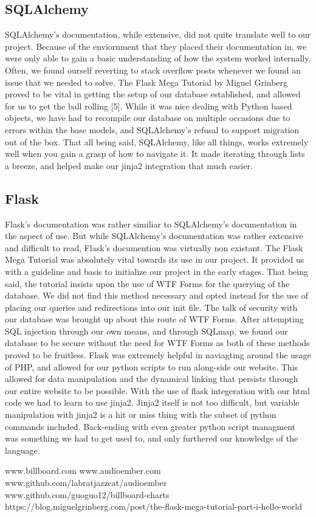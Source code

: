 \documentclass{article}
\begin{document}
\subsection*{SQLAlchemy}
SQLAlchemy's documentation, while extensive, did not quite translate well to our project.
Because of the enviornment that they placed their documentation in, we were only able to gain a basic understanding of how the system worked internally.
Often, we found ourself reverting to stack overflow posts whenever we found an issue that we needed to solve.
The Flask Mega Tutorial by Miguel Grinberg proved to be vital in getting the setup of our database established, and allowed for us to get the ball rolling [5].
While it was nice dealing with Python based objects, we have had to recompile our database on multiple occasions due to errors within the base models, and SQLAlchemy's refusal to support migration out of the box.
That all being said, SQLAlchemy, like all things, works extremely well when you gain a grasp of how to navigate it. It made iterating through lists a breeze, and helped make our jinja2 integration that much easier. 
\subsection*{Flask}
Flask's documentation was rather similiar to SQLAlchemy's documentation in the aspect of use.
But while SQLAlchemy's documentation was rather extensive and difficult to read, Flask's documention was virtually non existant.
The Flask Mega Tutorial was absolutely vital towards its use in our project.
It provided us with a guideline and basis to initialize our project in the early stages.
That being said, the tutorial insists upon the use of WTF Forms for the querying of the database.
We did not find this method necessary and opted instead for the use of placing our queries and redirections into our init file.
The talk of security with our database was brought up about this route of WTF Forms.
After attempting SQL injection through our own means, and through SQLmap, we found our database to be secure without the need for WTF Forms as both of these methods proved to be fruitless. 
Flask was extremely helpful in naviagting around the usage of PHP, and allowed for our python scripts to run along-side our website.
This allowed for data manipulation and the dynamical linking that persists through our entire website to be possible.
With the use of flask integeration with our html code we had to learn to use jinja2.
Jinja2 itself is not too difficult, but variable manipulation with jinja2 is a hit or miss thing with the subset of python commands included.
Back-ending with even greater python script managment was something we had to get used to, and only furthered our knowledge of the language.
\begin{thebibliography}{00}
www.billboard.com
www.audioember.com
www.github.com/labratjazzcat/audioember
www.github.com/guoguo12/billboard-charts
https://blog.miguelgrinberg.com/post/the-flask-mega-tutorial-part-i-hello-world


\end{thebibliography}
\end{document}
